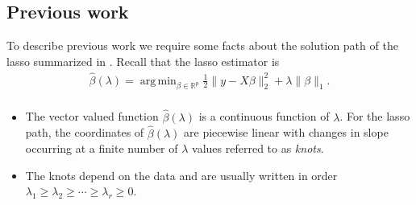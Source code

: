\documentclass[oupdraft]{bio}
\def\real{{\mathbb R}}
\DeclareMathOperator*{\argmin}{arg\,min}
\begin{document}
\subsection{Previous work}

To describe previous work we require some facts about the solution
path of the lasso summarized in
\cite{significance:lasso,tibshirani_lasso_uniqueness}.
Recall that the lasso estimator is 
\begin{equation}
\begin{aligned}
\label{eq:lasso}
\displaystyle \hat \beta(\lambda) = \argmin_{\beta \in \real^p} \frac{1}{2} \| y - X \beta \|_2^2 +
   \lambda \| \beta \|_1. \\
\end{aligned}
\end{equation}


\begin{itemize}
\item The vector valued function $\hat \beta(\lambda)$ is a continuous
function of $\lambda$. For the lasso path, the coordinates of $\hat
\beta(\lambda)$ are piecewise linear with changes in slope occurring
at a finite number of $\lambda$ values referred to as \emph{knots}.

\item The knots depend on the data and are usually written in order
$\lambda_1 \geq \lambda_2 \geq \cdots \geq \lambda_r \geq 0$.
\end{itemize}
\end{document}
